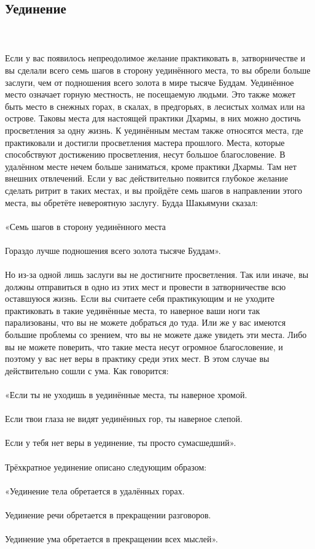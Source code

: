 \subsection{Уединение}
\\ \\ Если у вас появилось непреодолимое желание практиковать в, затворничестве и вы сделали всего семь шагов в сторону уединённого места, то вы обрели больше заслуги, чем от подношения всего золота в мире тысяче Буддам. Уединённое место означает горную местность, не посещаемую людьми. Это также может быть место в снежных горах, в скалах, в предгорьях, в лесистых холмах или на острове. Таковы места для настоящей практики Дхармы, в них можно достичь просветления за одну жизнь. К уединённым местам также относятся места, где практиковали и достигли просветления мастера прошлого. Места, которые способствуют достижению просветления, несут большое благословение. В удалённом месте нечем больше заниматься, кроме практики Дхармы. Там нет внешних отвлечений. Если у вас действительно появится глубокое желание сделать ритрит в таких местах, и вы пройдёте семь шагов в направлении этого места, вы обретёте невероятную заслугу. Будда Шакьямуни сказал:
\\ \\ «Семь шагов в сторону уединённого места 
\\ \\ Гораздо лучше подношения всего золота тысяче Буддам».
\\ \\ Но из-за одной лишь заслуги вы не достигните просветления. Так или иначе, вы должны отправиться в одно из этих мест и провести в затворничестве всю оставшуюся жизнь. Если вы считаете себя практикующим и не уходите практиковать в такие уединённые места, то наверное ваши ноги так парализованы, что вы не можете добраться до туда. Или же у вас имеются большие проблемы со зрением, что вы не можете даже увидеть эти места. Либо вы не можете поверить, что такие места несут огромное благословение, и поэтому у вас нет веры в практику среди этих мест. В этом случае вы действительно сошли с ума. Как говорится:
\\ \\ «Если ты не уходишь в уединённые места, ты наверное хромой. 
\\ \\ Если твои глаза не видят уединённых гор, ты наверное слепой. 
\\ \\ Если у тебя нет веры в уединение, ты просто сумасшедший».
\\ \\ Трёхкратное уединение описано следующим образом:
\\ \\ «Уединение тела обретается в удалённых горах. 
\\ \\ Уединение речи обретается в прекращении разговоров. 
\\ \\ Уединение ума обретается в прекращении всех мыслей».
